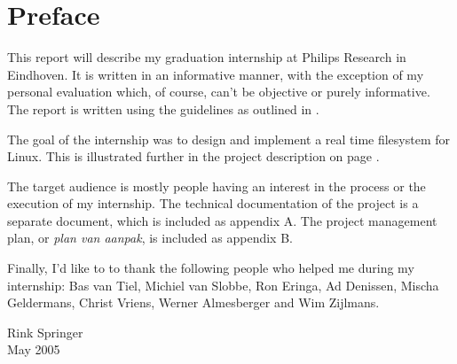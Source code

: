 \chapter{Preface}

This report will describe my graduation internship at Philips Research in Eindhoven. It is written in an informative manner, with the exception of my personal evaluation which, of course, can't be objective or purely informative. The report is written using the guidelines as outlined in \cite{ROR}.

The goal of the internship was to design and implement a real time filesystem for Linux. This is illustrated further in the project description on page \pageref{project}.

The target audience is mostly people having an interest in the process or the execution of my internship. The technical documentation of the project is a separate document, which is included as appendix A. The project management plan, or \emph{plan van aanpak}, is included as appendix B.

Finally, I'd like to to thank the following people who helped me during my internship: Bas van Tiel, Michiel van Slobbe, Ron Eringa, Ad Denissen, Mischa Geldermans, Christ Vriens, Werner Almesberger and Wim Zijlmans.

Rink Springer \\
May 2005
